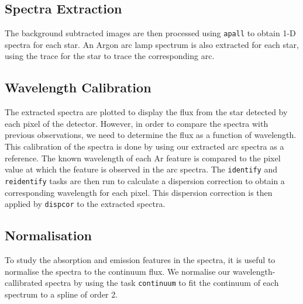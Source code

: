 
\subsection{Spectra Extraction}
\label{cha:InfraredDataReductionTechniques:sec:SpectroscopyData:subsec:SpectraExtraction}

The background subtracted images are then processed using
\texttt{apall} to obtain 1-D spectra for each star. An Argon arc lamp spectrum is also extracted for
each star, using the trace for the star to trace the corresponding arc. %


\subsection{Wavelength Calibration}
\label{cha:InfraredDataReductionTechniques:sec:SpectroscopyData:subsec:WavelengthCalibration}

The extracted spectra are plotted to display the flux from the star
detected by each pixel of the detector. However, in order to compare
the spectra with previous observations, we need to determine the
flux as a function of wavelength. This calibration of the spectra is
done by using our extracted arc spectra as a reference. The known
wavelength of each Ar feature is compared to the pixel value at which
the feature is observed in the arc spectra. The \texttt{identify} and \texttt{reidentify} tasks are
then run to calculate a dispersion correction to obtain a
corresponding wavelength for each pixel. This dispersion correction is then applied by \texttt{dispcor} to the extracted spectra. %


\subsection{Normalisation}
\label{cha:InfraredDataReductionTechniques:sec:SpectroscopyData:subsec:Normalisation}

To study the absorption and emission features in the spectra, it is useful to normalise the spectra to the continuum flux. We normalise our
wavelength-callibrated spectra by using the task \texttt{continuum} to
fit the continuum of each spectrum to a spline of order 2. %


